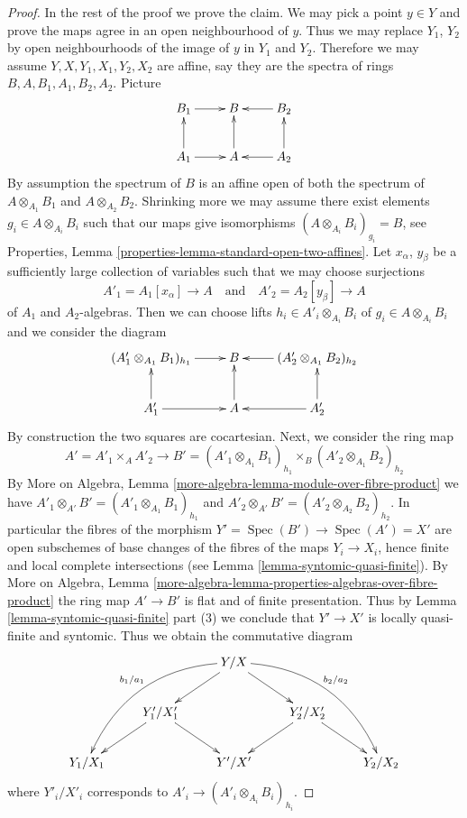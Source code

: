\documentclass{stacks-project}
\theoremstyle{plain}
\theoremstyle{definition}
\theoremstyle{remark}
\numberwithin{equation}{subsection}
\def\Spec{\mathop{\mathrm{Spec}}}
\begin{document}
\begin{proof}
\medskip\noindent
In the rest of the proof we prove the claim. We may pick a point
$y \in Y$ and prove the maps agree in an open neighbourhood of $y$.
Thus we may replace $Y_1$, $Y_2$ by open neighbourhoods of the
image of $y$ in $Y_1$ and $Y_2$. Therefore we may assume
$Y, X, Y_1, X_1, Y_2, X_2$ are affine, say they are the spectra
of rings $B, A, B_1, A_1, B_2, A_2$. Picture
$$
\xymatrix{
B_1 \ar[r] & B & B_2 \ar[l] \\
A_1 \ar[u] \ar[r] & A \ar[u] & A_2 \ar[l] \ar[u]
}
$$
By assumption the spectrum of $B$ is an affine open of
both the spectrum of $A \otimes_{A_1} B_1$ and $A \otimes_{A_2} B_2$.
Shrinking more we may assume there exist elements
$g_i \in A \otimes_{A_i} B_i$ such that our maps give isomorphisms
$(A \otimes_{A_i} B_i)_{g_i} = B$, see
Properties, Lemma \ref{properties-lemma-standard-open-two-affines}.
Let $x_\alpha$, $y_\beta$ be a sufficiently large collection of
variables such that we may choose surjections
$$
A'_1 = A_1[x_\alpha] \to A
\quad\text{and}\quad
A'_2 = A_2[y_\beta] \to A
$$
of $A_1$ and $A_2$-algebras. Then we can choose lifts
$h_i \in A'_i \otimes_{A_i} B_i$ of $g_i \in A \otimes_{A_i} B_i$
and we consider the diagram
$$
\xymatrix{
(A'_1 \otimes_{A_1} B_1)_{h_1} \ar[r] & B &
(A'_2 \otimes_{A_1} B_2)_{h_2} \ar[l] \\
A'_1 \ar[u] \ar[r] & A \ar[u] & A'_2 \ar[l] \ar[u]
}
$$
By construction the two squares are cocartesian. Next, we consider the
ring map
$$
A' = A'_1 \times_A A'_2 \longrightarrow
B' =
(A'_1 \otimes_{A_1} B_1)_{h_1} \times_B
(A'_2 \otimes_{A_1} B_2)_{h_2}
$$
By
More on Algebra, Lemma \ref{more-algebra-lemma-module-over-fibre-product}
we have $A'_1 \otimes_{A'} B' = (A'_1 \otimes_{A_1} B_1)_{h_1}$
and $A'_2 \otimes_{A'} B' = (A'_2 \otimes_{A_2} B_2)_{h_2}$. In particular
the fibres of the morphism $Y' = \Spec(B') \to \Spec(A') = X'$ are
open subschemes of base changes of the fibres of the maps $Y_i \to X_i$,
hence finite and local complete intersections
(see Lemma \ref{lemma-syntomic-quasi-finite}).
By More on Algebra, Lemma
\ref{more-algebra-lemma-properties-algebras-over-fibre-product}
the ring map $A' \to B'$ is flat and of finite presentation.
Thus by Lemma \ref{lemma-syntomic-quasi-finite} part (3)
we conclude that $Y' \to X'$ is locally quasi-finite and syntomic.
Thus we obtain the commutative diagram
$$
\xymatrix{
& & Y/X \ar[ld] \ar@/_2pc/[lldd]_{b_1/a_1} \ar[rd] \ar@/^2pc/[rrdd]^{b_2/a_2} \\
& Y'_1/X'_1 \ar[rd] \ar[ld] & & Y'_2/X'_2 \ar[ld] \ar[rd] \\
Y_1/X_1 & & Y'/X' & & Y_2/X_2
}
$$
where $Y'_i/X'_i$ corresponds to $A'_i \to (A'_i \otimes_{A_i} B_i)_{h_i}$.


\end{proof}
\end{document}
